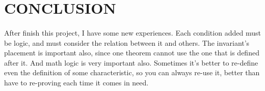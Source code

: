 \section{CONCLUSION}

\paragraph{}
After finish this project, I have some new experiences. Each condition added must be logic, and must consider the relation between it and others. The invariant's placement is important also, since one theorem cannot use the one that is defined after it. And math logic is very important also. Sometimes it's better to re-define even the definition of some characteristic, so you can always re-use it, better than have to re-proving each time it comes in need. 